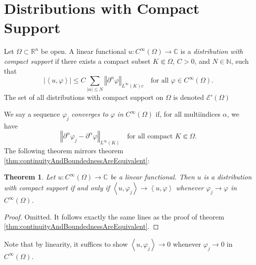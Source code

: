\documentclass{book}
\newcommand{\scrE}{\mathscr{E}}
\newcommand{\bbC}{\mathbb{C}}
\newcommand{\bbN}{\mathbb{N}}
\newcommand{\bbR}{\mathbb{R}}
\renewcommand{\phi}{\varphi}
\newcommand{\abs}[1]{\left\lvert {#1} \right\rvert}
\newcommand{\norm}[1]{\left\Vert {#1} \right\Vert}
\newcommand{\angles}[1]{\left\langle {#1} \right\rangle}
\newtheorem{theorem}{Theorem}[chapter]
\theoremstyle{definition}
\theoremstyle{remark}
\numberwithin{equation}{chapter}
\begin{document}
\section{Distributions with Compact Support}
Let $\Omega \subset \bbR^n$ be open. A linear functional $u \colon C^\infty(\Omega) \to \bbC$ is a \textit{distribution with compact support} if there exists a compact subset $K \Subset \Omega$, $C > 0$, and $N \in \bbN$, such that
\begin{equation} \label{eq:distributionWithCompactSupport}
    \abs{\angles{ u,\phi }} \leq C \sum_{\abs{\alpha} \leq N} \norm{ \partial^\alpha \phi }_{L^\infty(K)c} \quad \text{for all } \phi \in C^\infty(\Omega).
\end{equation}
The set of all distributions with compact support on $\Omega$ is denoted $\scrE'(\Omega)$

We say a sequence $\phi_j$ \textit{converges to} $\phi$ \textit{in} $C^\infty(\Omega)$ if, for all multiindices $\alpha$, we have
\begin{equation}
    \norm{ \partial^\alpha \phi_j - \partial^\alpha \phi }_{L^\infty(K)} \quad \text{for all compact } K \Subset \Omega.
\end{equation}
The following theorem mirrors theorem \ref{thm:continuityAndBoundednessAreEquivalent}:
\begin{theorem}
    Let $u \colon C^\infty(\Omega) \to \bbC$ be a linear functional. Then $u$ is a distribution with compact support if and only if $\angles{ u,\phi_j } \rightarrow \angles{ u,\phi }$ whenever $\phi_j \rightarrow \phi$ in $C^\infty(\Omega)$.
\end{theorem}
\begin{proof}
    Omitted. It follows exactly the same lines as the proof of theorem \ref{thm:continuityAndBoundednessAreEquivalent}.
\end{proof}
Note that by linearity, it suffices to show $\angles{ u,\phi_j } \rightarrow 0$ whenever $\phi_j \rightarrow 0$ in $C^\infty(\Omega)$.
\end{document}
